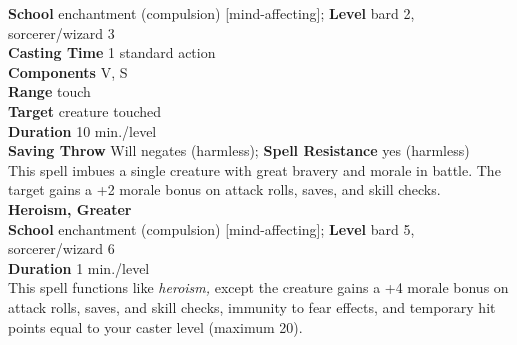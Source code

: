 \textbf{School} enchantment (compulsion) [mind-affecting]; \textbf{Level} bard 2, sorcerer/wizard 3\\
\textbf{Casting Time} 1 standard action\\
\textbf{Components} V, S\\
\textbf{Range} touch\\
\textbf{Target} creature touched\\
\textbf{Duration} 10 min./level\\
\textbf{Saving Throw }Will negates (harmless); \textbf{Spell Resistance} yes (harmless)\\
This spell imbues a single creature with great bravery and morale in battle. The target gains a +2 morale bonus on attack rolls, saves, and skill checks.\\
\textbf{Heroism, Greater}\\
\textbf{School} enchantment (compulsion) [mind-affecting]; \textbf{Level} bard 5, sorcerer/wizard 6\\
\textbf{Duration} 1 min./level\\
This spell functions like \textit{heroism, }except the creature gains a +4 morale bonus on attack rolls, saves, and skill checks, immunity to fear effects, and temporary hit points equal to your caster level (maximum 20).\\

